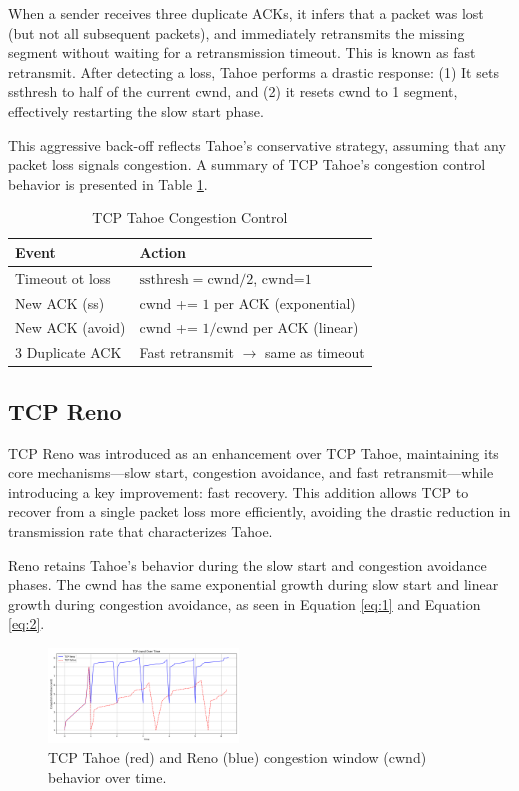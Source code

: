 \documentclass[conference]{IEEEtran}
\begin{document}
When a sender receives three duplicate ACKs, it infers that a packet was lost (but not all subsequent packets), and immediately retransmits the missing segment without waiting for a retransmission timeout. 
This is known as fast retransmit. After detecting a loss, Tahoe performs a drastic response:
(1) It sets ssthresh to half of the current cwnd, and (2) it resets cwnd to 1 segment, effectively restarting the slow start phase.

This aggressive back-off reflects Tahoe’s conservative strategy, assuming that any packet loss signals congestion.
A summary of TCP Tahoe's congestion control behavior is presented in Table \ref{tab:tcp_tahoe_desc}.
\begin{table}[!h]
    \centering
    \caption{TCP Tahoe Congestion Control}
    \begin{tabular}{@{}ll@{}}
        \toprule
        \textbf{Event} & \textbf{Action} \\ \midrule
        Timeout ot loss  & $\text{ssthresh} = \text{cwnd}/2$, $\text{cwnd=1}$  \\
        New ACK (ss)     & $\text{cwnd}$ += $1$ per ACK (exponential)  \\
        New ACK (avoid)  & $\text{cwnd}$ += $1/\text{cwnd}$ per ACK (linear) \\ 
        3 Duplicate ACK  &  Fast retransmit $\rightarrow$ same as timeout\\ \bottomrule
    \end{tabular}
    \label{tab:tcp_tahoe_desc}
\end{table}

\subsection{TCP Reno}
TCP Reno was introduced as an enhancement over TCP Tahoe, maintaining its core mechanisms—slow start, congestion avoidance, and fast retransmit—while introducing a key improvement: fast recovery. 
This addition allows TCP to recover from a single packet loss more efficiently, avoiding the drastic reduction in transmission rate that characterizes Tahoe.

Reno retains Tahoe's behavior during the slow start and congestion avoidance phases.
The cwnd has the same exponential growth during slow start and linear growth during congestion avoidance, as seen in Equation \eqref{eq:1} and Equation \eqref{eq:2}.

\begin{figure}[!b]
    \centering
    \includegraphics[width=0.45\textwidth]{assets/tahoe_reno_cwnd_vs_t.png}
    \caption{TCP Tahoe (red) and Reno (blue) congestion window (cwnd) behavior over time.}
    \label{fig:tahoe_reno_cwnd}
\end{figure}
\end{document}
